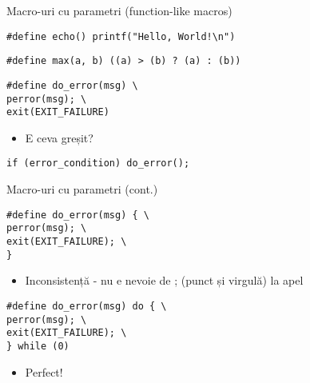 \documentclass{beamer}
\begin{document}
\begin{frame}{Macro-uri cu parametri (function-like macros)}
			\begin{beamerboxesrounded}[lower=block body,shadow=true]{}
\texttt{\#define echo()  printf("Hello, World!\textbackslash{}n")}
			\end{beamerboxesrounded}
			\begin{beamerboxesrounded}[lower=block body,shadow=true]{}
\texttt{\#define max(a, b)   ((a) \textgreater{} (b) ? (a) : (b))}
			\end{beamerboxesrounded}
			\begin{beamerboxesrounded}[lower=block body,shadow=true]{}
\texttt{\#define do\_error(msg) \textbackslash{} \\
\hlstd{}\hlstd{\ \ \ \ \ \ \ \ }\hlstd{}perror(msg);	\textbackslash{} \\
\hlstd{}\hlstd{\ \ \ \ \ \ \ \ }\hlstd{}exit(EXIT\_FAILURE)
	}
			\end{beamerboxesrounded}
	\begin{itemize}
		\pause \item E ceva greșit?
	\end{itemize}
			\pause \begin{beamerboxesrounded}[lower=block body,shadow=true]{}
\texttt{if (error\_condition) do\_error();}
			\end{beamerboxesrounded}
\end{frame}

\begin{frame}{Macro-uri cu parametri (cont.)}
			\begin{beamerboxesrounded}[lower=block body,shadow=true]{}
\texttt{\#define do\_error(msg) \{ \textbackslash{} \\
\hlstd{}\hlstd{\ \ \ \ \ \ \ \ }\hlstd{}perror(msg);	\textbackslash{} \\
\hlstd{}\hlstd{\ \ \ \ \ \ \ \ }\hlstd{}exit(EXIT\_FAILURE); \textbackslash{} \\
\}
	}
			\end{beamerboxesrounded}
	\begin{itemize}
		\pause \item Inconsistență - nu e nevoie de ; (punct și virgulă) la apel
	\end{itemize}
			\pause \begin{beamerboxesrounded}[lower=block body,shadow=true]{}
\texttt{\#define do\_error(msg) do \{ \textbackslash{} \\
\hlstd{}\hlstd{\ \ \ \ \ \ \ \ }\hlstd{}perror(msg);	\textbackslash{} \\
\hlstd{}\hlstd{\ \ \ \ \ \ \ \ }\hlstd{}exit(EXIT\_FAILURE); \textbackslash{} \\
\} while (0)
	}
			\end{beamerboxesrounded}
	\begin{itemize}
		\pause \item Perfect!
	\end{itemize}
\end{frame}
\end{document}
